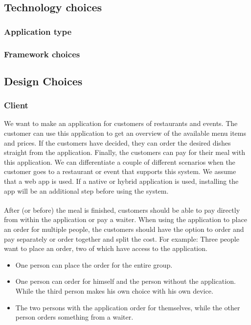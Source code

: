 \documentclass[12pt]{article}
\begin{document}
\subsection{Technology choices}
\subsubsection{Application type}
\subsubsection{Framework choices}
\subsection{Design Choices}
\subsubsection{Client}
We want to make an application for customers of restaurants and events. The customer can use this application to get an overview of the available menu items and prices. If the customers have decided, they can order the desired dishes straight from the application. Finally, the customers can pay for their meal with this application.
We can differentiate a couple of different scenarios when the customer goes to a restaurant or event that supports this system. We assume that a web app is used. If a native or hybrid application is used, installing the app will be an additional step before using the system.
\\\\
After (or before) the meal is finished, customers should be able to pay directly from within the application or pay a waiter. When using the application to place an order for multiple people, the customers should have the option to order and pay separately or order together and split the cost. 
For example: Three people want to place an order, two of which have access to the application. 
\begin{itemize}
\item One person can place the order for the entire group.
\item One person can order for himself and the person without the application. While the third person makes his own choice with his own device.
\item The two persons with the application order for themselves, while the other person orders something from a waiter.
\end{itemize}
\end{document}
